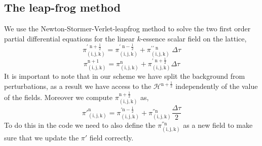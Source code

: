 \documentclass[a4paper,11pt]{article}
\def\be{\begin{equation}}
\def\ee{\end{equation}}
\newcommand{\lat}{{ (\mathrm i,\mathrm j,\mathrm k )}}
\newcommand {\mf}{\mathrm}
\newcommand {\sn}{\mathrm n}
\begin{document}
\subsection{The leap-frog method}
We use the Newton-Stormer-Verlet-leapfrog method \cite{EHairer} to solve the two first order partial differential equations for the linear $k$-essence scalar field on the lattice,
 \be
  \pi^{\prime \; \mf n+\frac{1}{2}}_{ \lat}=   \pi^{ \prime \; \mf n-{\frac{1}{2}} } _{ \lat}+   \pi^{ \prime \prime \; \mf n}_{\lat} \; \Delta \tau \label{ref_v_prime}
  \ee
  \be
      \pi^{\sn +1}_{\lat}=\pi^{\sn }_{\lat} + \pi^{\prime \; \sn+\frac{1}{2}}_{\lat} \Delta \tau \label{B2}
\ee
      It is important to note that in our scheme we have split the background from perturbations, as a result we have access to the $\mathcal{H}^{\sn +\frac12}$ independently of the value of the fields.
Moreover we compute $ \pi^{\sn+\frac{1}{2}}_{ \lat}$ as,
  \be
   \pi'^{\sn} _{ \lat}={\pi^{' \sn-\frac{1}{2}}_{ \lat} +   \pi^{'' \sn}_{\lat}}  \frac{\Delta \tau}{2} \label{B4}
  \ee
  To do this in the code we need to also define the $\pi^{'' \sn}_{\lat} $ as a new field to make sure that we update the $\pi'$ field correctly.
\end{document}
